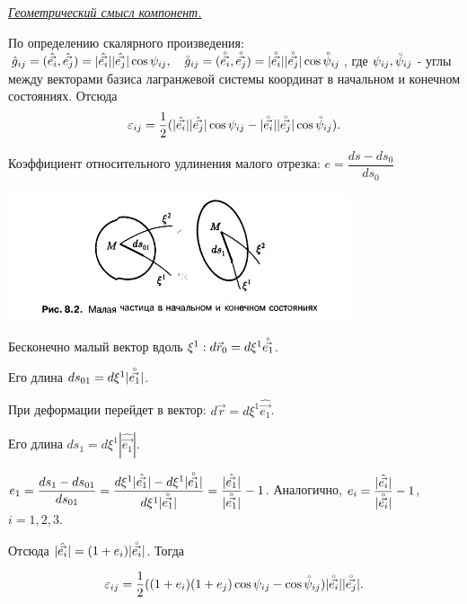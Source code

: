 \begin{center}
  \textit{\underline{Геометрический смысл компонент.}}
\end{center}

По определению скалярного произведения: $\hat g_{ij} = (\hat{\vec{e_i}}, \hat{\vec{e_j}}) = |\hat{\vec{e_i}}||\hat{\vec{e_j}}|\cos\psi_{ij}, \quad \accentset{\circ}{g}_{ij} = (\accentset{\circ}{\vec{e_i}}, \accentset{\circ}{\vec{e_j}}) = |\accentset{\circ}{\vec{e_i}}||\accentset{\circ}{\vec{e_j}}|\cos\accentset{\circ}{\psi}_{ij}$, где $\psi_{ij}, \accentset{\circ}{\psi}_{ij}$ - углы между векторами базиса лагранжевой системы координат в начальном и конечном состояниях. Отсюда
$$
  \varepsilon_{ij} = \frac{1}{2}(|\hat{\vec{e_i}}||\hat{\vec{e_j}}|\cos\psi_{ij} - |\accentset{\circ}{\vec{e_i}}||\accentset{\circ}{\vec{e_j}}|\cos\accentset{\circ}{\psi}_{ij}).
$$

Коэффициент относительного удлинения малого отрезка: $e = \dfrac{ds - ds_0}{ds_0}$

\noindent
\parbox[b][4cm][t]{10mm}{
  \includegraphics[height=3.75cm]{03/3_3.jpg}}
\hfill
\parbox[b][4cm][t]{68mm}{
  Бесконечно малый вектор вдоль $\xi^1: d\vec r_0 = d\xi^1\accentset{\circ}{\vec{e_1}}$.

  Его длина $ds_{01} = d\xi^1|\accentset{\circ}{\vec{e_1}}|$.

  При деформации перейдет в вектор: $d\vec r = d\xi^1\hat{\vec{e_1}}$.

  Его длина $ds_{1} = d\xi^1|\hat{\vec{e_1}}|$.


}

\hfill

$e_1 = \dfrac{ds_1 - ds_{01}}{ds_{01}} = \dfrac{d\xi^1|\hat{\vec{e_1}}| - d\xi^1|\accentset{\circ}{\vec{e_1}}|}{d\xi^1|\accentset{\circ}{\vec{e_1}}|} = \dfrac{|\hat{\vec{e_1}}|}{|\accentset{\circ}{\vec{e_1}}|} - 1$. Аналогично, $e_i = \dfrac{|\hat{\vec{e_i}}|}{|\accentset{\circ}{\vec{e_i}}|} - 1$, $i = 1,2,3$.

Отсюда $|\hat{\vec{e_i}}| = (1+e_i)|\accentset{\circ}{\vec{e_i}}|$. Тогда

$$
  \varepsilon_{ij} = \dfrac{1}{2}((1+e_i)(1+e_j)\cos\psi_{ij} - \cos\accentset{\circ}{\psi}_{ij})|\accentset{\circ}{\vec{e_i}}||\accentset{\circ}{\vec{e_j}}|.
$$

